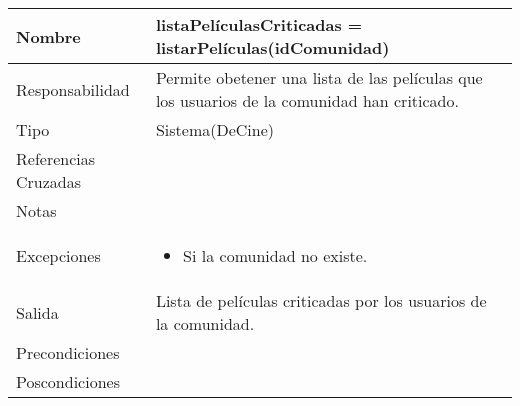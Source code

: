 \documentclass{article}
\begin{document}
\begin{table}[h]
\begin{tabular}{|l|l|l|l|l|l|}
\hline
\multicolumn{2}{|p{3cm}|}{Nombre} & \multicolumn{4}{p{10cm}|}{\textbf{listaPelículasCriticadas = listarPelículas(idComunidad)}}\\
\hline
\multicolumn{2}{|p{3cm}|}{Responsabilidad} & \multicolumn{4}{p{10cm}|}{Permite obetener una lista de las películas que los usuarios de la comunidad han criticado.} \\
\hline
\multicolumn{2}{|p{3cm}|}{Tipo} & \multicolumn{4}{p{10cm}|}{Sistema(DeCine)} \\
\hline
\multicolumn{2}{|p{3cm}|}{Referencias Cruzadas} & \multicolumn{4}{p{10cm}|}{} \\
\hline
\multicolumn{2}{|p{3cm}|}{Notas} & \multicolumn{4}{p{10cm}|}{} \\
\hline
\multicolumn{2}{|p{3cm}|}{Excepciones} & \multicolumn{4}{p{10cm}|}{\begin{itemize}
\item Si la comunidad no existe.
\end{itemize}} \\
\hline
\multicolumn{2}{|p{3cm}|}{Salida} & \multicolumn{4}{p{10cm}|}{Lista de películas criticadas por los usuarios de la comunidad.} \\
\hline
\multicolumn{2}{|p{3cm}|}{Precondiciones} & \multicolumn{4}{p{10cm}|}{} \\
\hline
\multicolumn{2}{|p{3cm}|}{Poscondiciones} & \multicolumn{4}{p{10cm}|}{} \\
\hline
\end{tabular}
\end{table}
\end{document}
